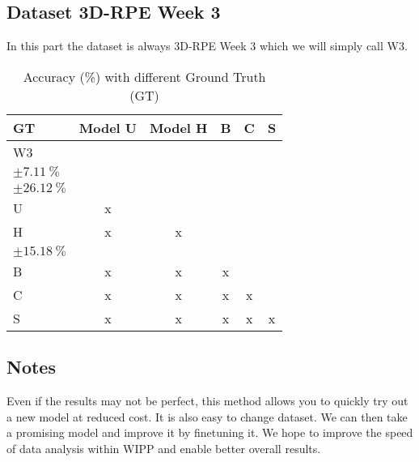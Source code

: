 \subsection{Dataset 3D-RPE Week 3}


In this part the dataset is always 3D-RPE Week 3 which we will simply call W3.

\begin{table}[H]
\small
\centering
\caption{\label{tab:base3dRPEdatamask}%
  Accuracy (\%) with different Ground Truth (GT)
}
\begin{tabular}{lccccc}
  \toprule
  GT & Model U & Model H & B & C & S \\
  \midrule
  W3 &  & \makecell{$\SI{91.87}{\percent}$ \\ $\pm \SI{7.11}{\percent}$} &  &  & \makecell{$\SI{77.69}{\percent}$ \\ $\pm \SI{26.12}{\percent}$} \\
  U & x &  &  &  &  \\
  H & x & x &  &  & \makecell{$\SI{89.42}{\percent}$ \\ $\pm \SI{15.18}{\percent}$} \\
  B & x & x & x &  &  \\
  C & x & x & x & x &  \\
  S & x & x & x & x &  x \\
  \bottomrule
\end{tabular}
\end{table}





\subsection{Notes}

Even if the results may not be perfect, this method allows you to quickly try
out a new model at reduced cost. It is also easy to change dataset. We can then
take a promising model and improve it by finetuning it. We hope to improve the
speed of data analysis within WIPP and enable better overall results.
